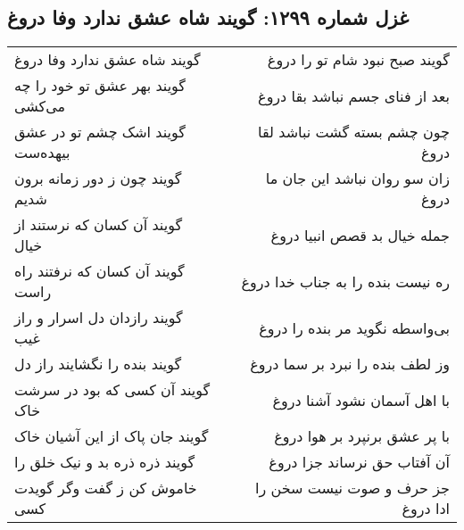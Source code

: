 \begin{center}
\section*{غزل شماره ۱۲۹۹: گویند شاه عشق ندارد وفا دروغ}
\label{sec:1299}
\begin{longtable}{l p{0.5cm} r}
گویند شاه عشق ندارد وفا دروغ
&&
گویند صبح نبود شام تو را دروغ
\\
گویند بهر عشق تو خود را چه می‌کشی
&&
بعد از فنای جسم نباشد بقا دروغ
\\
گویند اشک چشم تو در عشق بیهده‌ست
&&
چون چشم بسته گشت نباشد لقا دروغ
\\
گویند چون ز دور زمانه برون شدیم
&&
زان سو روان نباشد این جان ما دروغ
\\
گویند آن کسان که نرستند از خیال
&&
جمله خیال بد قصص انبیا دروغ
\\
گویند آن کسان که نرفتند راه راست
&&
ره نیست بنده را به جناب خدا دروغ
\\
گویند رازدان دل اسرار و راز غیب
&&
بی‌واسطه نگوید مر بنده را دروغ
\\
گویند بنده را نگشایند راز دل
&&
وز لطف بنده را نبرد بر سما دروغ
\\
گویند آن کسی که بود در سرشت خاک
&&
با اهل آسمان نشود آشنا دروغ
\\
گویند جان پاک از این آشیان خاک
&&
با پر عشق برنپرد بر هوا دروغ
\\
گویند ذره ذره بد و نیک خلق را
&&
آن آفتاب حق نرساند جزا دروغ
\\
خاموش کن ز گفت وگر گویدت کسی
&&
جز حرف و صوت نیست سخن را ادا دروغ
\\
\end{longtable}
\end{center}

